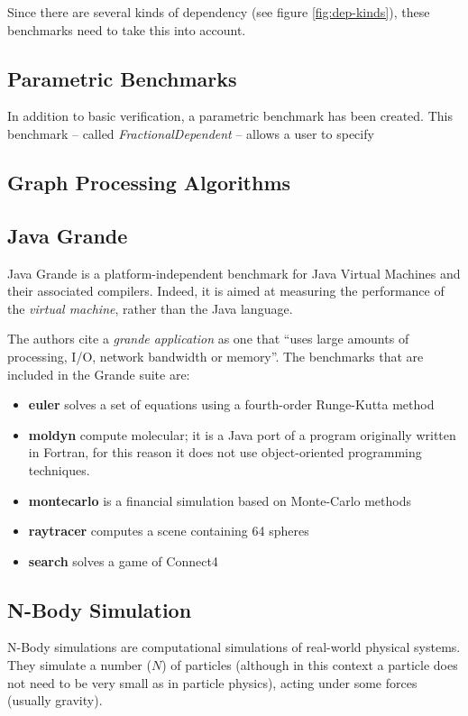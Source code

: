 	Since there are several kinds of dependency (see figure \ref{fig:dep-kinds}), these benchmarks need to take this into account.
	
	\subsection{Parametric Benchmarks} \label{sec:methodology/benchmarks/parametric}
	In addition to basic verification, a parametric benchmark has been created. This benchmark -- called \textit{FractionalDependent} -- allows a user to specify 
	
	\subsection{Graph Processing Algorithms} \label{sec:methodology/benchmarks/graphs}
	
	\subsection{Java Grande} \label{sec:methodology/benchmarks/grande}
	Java Grande \citep{Smith2001,Bull2001} is a platform-independent benchmark for Java Virtual Machines and their associated compilers. Indeed, it is aimed at measuring the performance of the \emph{virtual machine}, rather than the Java language.
	
	The authors cite a \textit{grande application} as one that ``uses large amounts of processing, I/O, network bandwidth or memory''. The benchmarks that are included in the Grande suite are:
	
	\begin{itemize}
		\item \textbf{euler} solves a set of equations using a fourth-order Runge-Kutta method
		\item \textbf{moldyn} compute molecular; it is a Java port of a program originally written in Fortran, for this reason it does not use object-oriented programming techniques.
		\item \textbf{montecarlo} is a financial simulation based on Monte-Carlo methods
		\item \textbf{raytracer} computes a scene containing 64 spheres
		\item \textbf{search} solves a game of Connect4
	\end{itemize}
	
	\subsection{N-Body Simulation} \label{sec:methodology/benchmarks/nbody}
	N-Body simulations \citep{Trenti2008} are computational simulations of real-world physical systems. They simulate a number ($N$) of particles (although in this context a particle does not need to be very small as in particle physics), acting under some forces (usually gravity).
	
